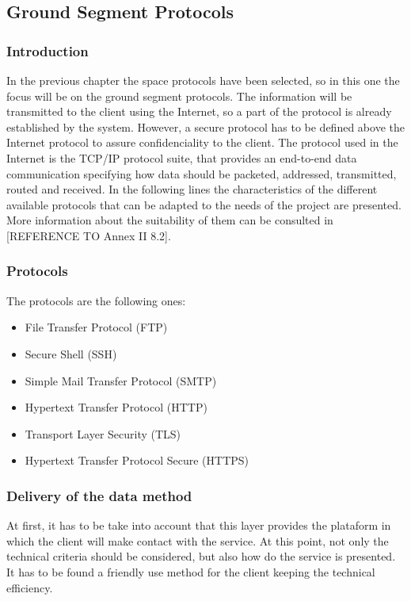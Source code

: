 \subsection{Ground Segment Protocols}
\subsubsection{Introduction}
In the previous chapter the space protocols have been selected, so in this one the focus will be on the ground segment protocols. The information will be transmitted to the client using the Internet, so a part of the protocol is already established by the system. However, a secure protocol has to be defined above the Internet protocol to assure confidenciality to the client. The protocol used in the Internet is the TCP/IP protocol suite, that provides an end-to-end data communication specifying how data should be packeted, addressed, transmitted, routed and received.
In the following lines the characteristics of the different available protocols that can be adapted to the needs of the project are presented. More information about the suitability of them can be consulted in [REFERENCE TO Annex II 8.2].
\subsubsection{Protocols}
The protocols are the following ones:
\begin{itemize}
\item File Transfer Protocol (FTP)
\item Secure Shell (SSH)
\item Simple Mail Transfer Protocol (SMTP)
\item Hypertext Transfer Protocol (HTTP)
\item Transport Layer Security (TLS)
\item Hypertext Transfer Protocol Secure (HTTPS)
\end{itemize} 
\subsubsection{Delivery of the data method} 
At first, it has to be take into account that this layer provides the plataform in which the client will make contact with the service. At this point, not only the technical criteria should be considered, but also how do the service is presented. It has to be found a friendly use method for the client keeping the technical efficiency.

